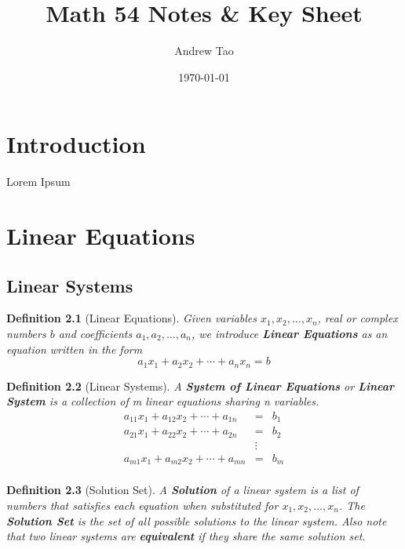 \documentclass[12pt]{report}
\title{Math 54 Notes \& Key Sheet}
\author{Andrew Tao}
\date{\today}
\newtheorem{dfn}{Definition}
\begin{document}
\maketitle

\chapter{Introduction}

Lorem Ipsum

\chapter{Linear Equations}

\section{Linear Systems}

\begin{dfn}[Linear Equations]
Given variables $x_1,x_2,\ldots,x_n$, real or complex numbers $b$ and coefficients $a_1,a_2,\ldots,a_n$,
we introduce \textbf{Linear Equations} as an equation written in the form
\begin{equation}
	a_1x_1+a_2x_2+\cdots+a_nx_n=b
\end{equation}
\end{dfn}

\begin{dfn}[Linear Systems]
A \textbf{System of Linear Equations} or \textbf{Linear System} is a collection of m linear equations sharing n variables.
\begin{equation}
\begin{aligned}
	a_{11}x_1+a_{12}x_2+\cdots+a_{1n} & = & b_1\\
	a_{21}x_1+a_{22}x_2+\cdots+a_{2n} & = & b_2\\
	& \vdots & \\
	a_{m1}x_1+a_{m2}x_2+\cdots+a_{mn} & = & b_m\\
\end{aligned}
\end{equation}
\end{dfn}

\begin{dfn}[Solution Set]
A \textbf{Solution} of a linear system is a list of numbers that satisfies each equation when substituted for $x_1,x_2,\ldots,x_n$. The \textbf{Solution Set} is the set of all possible solutions to the linear system. Also note that two linear systems are \textbf{equivalent} if they share the same solution set.
\end{dfn}
\end{document}
